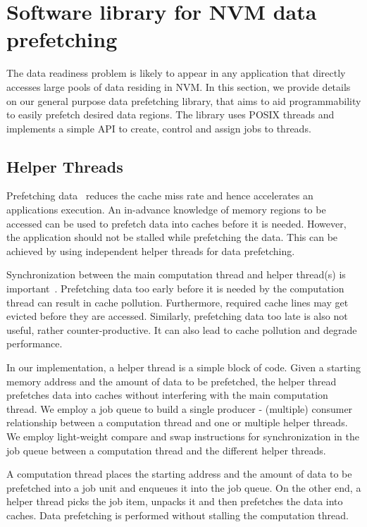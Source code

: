 \section{Software library for NVM data prefetching}
\label{sec:library}
\noindent The data readiness problem is likely to appear in any application that directly accesses large pools of data residing in NVM. In this section, we provide details on our general purpose data prefetching library, that aims to aid programmability to easily prefetch desired data regions. The library uses POSIX threads and implements a simple API to create, control and assign jobs to threads.

\subsection{Helper Threads}

Prefetching data~\cite{annavaram2001data} reduces the cache miss rate and hence
accelerates an application\textquotesingle s execution. An in-advance knowledge of memory regions
to be accessed can be used to prefetch data into caches before it is needed. However,
the application should not be stalled while prefetching the data. This can be achieved
by using independent helper threads for data prefetching.

Synchronization between the main computation thread and helper thread(s) is 
important~\cite{jung2006helper}. Prefetching data too early before it is needed
by the computation thread can result in cache pollution. Furthermore, required
cache lines may get evicted before they are accessed. Similarly, prefetching data
too late is also not useful, rather counter-productive. It can also lead to cache
pollution and degrade performance.

In our implementation, a helper thread is a simple block of code. Given a starting
memory address and the amount of data to be prefetched, the helper thread prefetches
data into caches without interfering with the main computation thread. We employ a
job queue to build a single producer - (multiple) consumer relationship between
a computation thread and one or multiple helper threads. We employ light-weight 
compare and swap instructions for synchronization in the job queue between a 
computation thread and the different helper threads.

A computation thread places the starting address and the amount of data to be prefetched into a job unit and enqueues it into the job queue. On the other end, a helper thread picks the job item, unpacks it and then prefetches the data into caches. Data prefetching is performed without stalling the computation thread.

